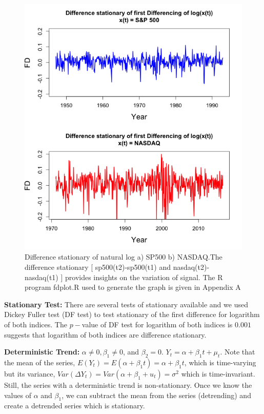 \begin{figure}[!ht]
\centering
\includegraphics[scale=.65]{Images/DS}
\caption{Difference stationary of natural log a) SP500 b) NASDAQ.The difference stationary [ sp500(t2)-sp500(t1) and nasdaq(t2)-nasdaq(t1) ] provides insights on the variation of signal. The R program fdplot.R used to generate the graph is given in Appendix A}
\label{fig:DS}
\end{figure}

\textbf{Stationary Test:} There are several tests of stationary available and we used Dickey Fuller test (DF test) to test stationary of the first difference for logarithm of both indices. The $p-$value of DF test for logarithm of both indices is $0.001$ suggests that logarithm of both indices are difference stationary.  


\textbf{Deterministic Trend:} $\alpha \neq 0, \beta_1 \neq 0$, and $\beta_2=0$. $Y_t = \alpha + \beta_1 t + \mu_t$. Note that the mean of the series, $E(Y_t) = E(\alpha + \beta_{1}t) = \alpha + \beta_{1}t$, which is time-varying but its variance, \textit {$Var(\Delta Y_t) = Var(\alpha + \beta_{1}+u_t) = \sigma^2$} which is time-invariant. Still, the series with a deterministic trend is non-stationary. Once we know the values of $\alpha$ and $\beta_{1}$, we can subtract the mean from the series (detrending) and create a detrended series which is stationary. 


